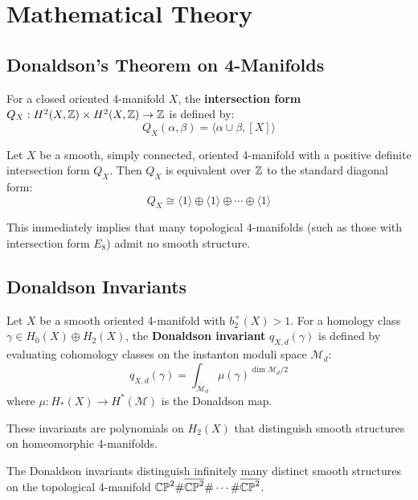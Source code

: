 \section{Mathematical Theory}

\subsection{Donaldson's Theorem on 4-Manifolds}

\begin{definition}
For a closed oriented 4-manifold $X$, the \textbf{intersection form} $Q_X: H^2(X,\mathbb{Z}) \times H^2(X,\mathbb{Z}) \to \mathbb{Z}$ is defined by:
\[
Q_X(\alpha, \beta) = \langle \alpha \cup \beta, [X] \rangle
\]
\end{definition}

\begin{theorem}[Donaldson, 1983]
Let $X$ be a smooth, simply connected, oriented 4-manifold with a positive definite intersection form $Q_X$. Then $Q_X$ is equivalent over $\mathbb{Z}$ to the standard diagonal form:
\[
Q_X \cong \langle 1 \rangle \oplus \langle 1 \rangle \oplus \cdots \oplus \langle 1 \rangle
\]
\end{theorem}

This immediately implies that many topological 4-manifolds (such as those with intersection form $E_8$) admit no smooth structure.

\subsection{Donaldson Invariants}

\begin{definition}
Let $X$ be a smooth oriented 4-manifold with $b_2^+(X) > 1$. For a homology class $\gamma \in H_0(X) \oplus H_2(X)$, the \textbf{Donaldson invariant} $q_{X,d}(\gamma)$ is defined by evaluating cohomology classes on the instanton moduli space $\mathcal{M}_d$:
\[
q_{X,d}(\gamma) = \int_{\overline{\mathcal{M}}_d} \mu(\gamma)^{\dim \mathcal{M}_d/2}
\]
where $\mu: H_*(X) \to H^*(\mathcal{M})$ is the Donaldson map.
\end{definition}

These invariants are polynomials on $H_2(X)$ that distinguish smooth structures on homeomorphic 4-manifolds.

\begin{theorem}[Donaldson, 1990]
The Donaldson invariants distinguish infinitely many distinct smooth structures on the topological 4-manifold $\mathbb{CP}^2 \# \overline{\mathbb{CP}^2} \# \cdots \# \overline{\mathbb{CP}^2}$.
\end{theorem}

